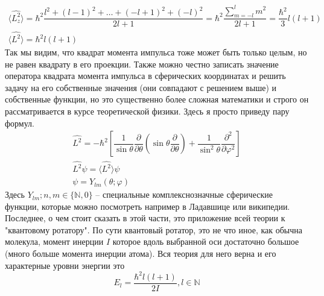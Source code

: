 \documentclass[12pt]{article}
\begin{document}
\begin{gather*}
    \langle \hat{L_z^2}\rangle=\hbar^2\dfrac{l^2+ (l-1)^2 +\dots +(-l+1)^2 +(-l)^2}{2l+1} =\hbar^2\dfrac{\sum\limits_{m=-l}^{l}m^2}{2l+1} = \dfrac{\hbar^2}{3}l(l+1)\\
    \langle \hat{L^2}\rangle = \hbar^2l(l+1)
\end{gather*}
Так мы видим, что квадрат момента импульса тоже может быть только целым, но не равен квадрату в его проекции. 
Также можно честно записать значение оператора квадрата момента импульса в сферических координатах и решить задачу на его собственные значения (они совпадают с решением выше) и собственные функции, но это существенно более сложная математики и строго он рассматривается в курсе теоретической физики.  Здесь я просто приведу пару формул. 
\begin{gather*}
     \hat{L^2} = -\hbar^2 \left[ \dfrac{1}{\sin{\theta}}\dfrac{\partial}{\partial\theta} \left(\sin{\theta}\dfrac{\partial}{\partial \theta}\right) + \dfrac{1}{\sin^2{\theta}}\dfrac{\partial^2}{\partial \varphi^2}\right]\\
     \hat{L^2} \psi = \langle \hat{L^2}\rangle \psi\\
     \psi = Y_{lm}(\theta; \varphi)
\end{gather*}
Здесь $Y_{lm}; n,m \in \{\mathbb{N}, 0\}$ -- специальные комплекснозначные сферические функции, которые можно посмотреть например в Ладавшице или википедии.\\
Последнее, о чем стоит сказать в этой части, это приложение всей теории к "квантовому ротатору". По сути квантовый ротатор, это не что иное, как обычна молекула, момент инерции $I$ которое вдоль выбранной оси достаточно большое (много больше момента инерции атома). Вся теория для него верна и его характерные уровни энергии это
\begin{equation}
    E_l=\dfrac{\hbar^2l(l+1)}{2I}, l\in \mathbb{N}
\end{equation}
\end{document}
